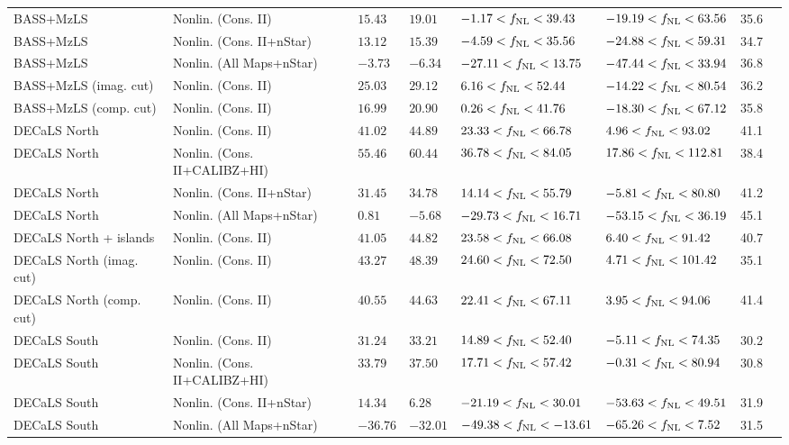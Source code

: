 \begin{table}
{\begin{tabular}{llllllll}
\hline
BASS+MzLS                        & Nonlin. (Cons. II)& $ 15.43$& $ 19.01$& $ -1.17<f_{\rm NL}< 39.43$& $-19.19<f_{\rm NL}< 63.56$ &   35.6\\
BASS+MzLS                        & Nonlin. (Cons. II+nStar)& $ 13.12$& $ 15.39$& $ -4.59<f_{\rm NL}< 35.56$& $-24.88<f_{\rm NL}< 59.31$ &   34.7\\
BASS+MzLS                        & Nonlin. (All Maps+nStar)& $ -3.73$& $ -6.34$& $-27.11<f_{\rm NL}< 13.75$& $-47.44<f_{\rm NL}< 33.94$ &   36.8\\
BASS+MzLS (imag. cut)      & Nonlin. (Cons. II)& $ 25.03$& $ 29.12$& $  6.16<f_{\rm NL}< 52.44$& $-14.22<f_{\rm NL}< 80.54$ &   36.2\\
BASS+MzLS (comp. cut)     & Nonlin. (Cons. II)& $ 16.99$& $ 20.90$& $  0.26<f_{\rm NL}< 41.76$& $-18.30<f_{\rm NL}< 67.12$ &   35.8\\
DECaLS North                     & Nonlin. (Cons. II)& $ 41.02$& $ 44.89$& $ 23.33<f_{\rm NL}< 66.78$& $  4.96<f_{\rm NL}< 93.02$ &   41.1\\
DECaLS North                     & Nonlin. (Cons. II+CALIBZ+HI)& $ 55.46$& $ 60.44$& $ 36.78<f_{\rm NL}< 84.05$& $ 17.86<f_{\rm NL}<112.81$ &   38.4\\
DECaLS North                     & Nonlin. (Cons. II+nStar)& $ 31.45$& $ 34.78$& $ 14.14<f_{\rm NL}< 55.79$& $ -5.81<f_{\rm NL}< 80.80$ &   41.2\\
DECaLS North                     & Nonlin. (All Maps+nStar)& $  0.81$& $ -5.68$& $-29.73<f_{\rm NL}< 16.71$& $-53.15<f_{\rm NL}< 36.19$ &   45.1\\
DECaLS North + islands      & Nonlin. (Cons. II)& $ 41.05$& $ 44.82$& $ 23.58<f_{\rm NL}< 66.08$& $  6.40<f_{\rm NL}< 91.42$ &   40.7\\
DECaLS North (imag. cut)   & Nonlin. (Cons. II)& $ 43.27$& $ 48.39$& $ 24.60<f_{\rm NL}< 72.50$& $  4.71<f_{\rm NL}<101.42$ &   35.1\\
DECaLS North (comp. cut)  & Nonlin. (Cons. II)& $ 40.55$& $ 44.63$& $ 22.41<f_{\rm NL}< 67.11$& $  3.95<f_{\rm NL}< 94.06$ &   41.4\\
DECaLS South                    & Nonlin. (Cons. II)& $ 31.24$& $ 33.21$& $ 14.89<f_{\rm NL}< 52.40$& $ -5.11<f_{\rm NL}< 74.35$ &   30.2\\
DECaLS South                    & Nonlin. (Cons. II+CALIBZ+HI)& $ 33.79$& $ 37.50$& $ 17.71<f_{\rm NL}< 57.42$& $ -0.31<f_{\rm NL}< 80.94$ &   30.8\\
DECaLS South                    & Nonlin. (Cons. II+nStar)& $ 14.34$& $  6.28$& $-21.19<f_{\rm NL}< 30.01$& $-53.63<f_{\rm NL}< 49.51$ &   31.9\\
DECaLS South                    & Nonlin. (All Maps+nStar)& $-36.76$& $-32.01$& $-49.38<f_{\rm NL}<-13.61$& $-65.26<f_{\rm NL}<  7.52$ &   31.5\\

\end{tabular}}
\end{table}
